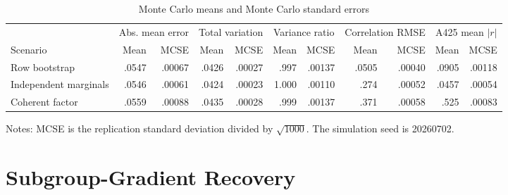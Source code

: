 \documentclass[11pt]{article}
\begin{document}
\begin{table}[!htbp]
\centering
\caption{Monte Carlo means and Monte Carlo standard errors}
\label{tab:s5-simulation}
\begin{threeparttable}
\scriptsize
\begin{tabular}{lrrrrrrrrrr}
\toprule
& \multicolumn{2}{c}{Abs. mean error}
& \multicolumn{2}{c}{Total variation}
& \multicolumn{2}{c}{Variance ratio}
& \multicolumn{2}{c}{Correlation RMSE}
& \multicolumn{2}{c}{A425 mean $|r|$} \\
\cmidrule(lr){2-3}\cmidrule(lr){4-5}\cmidrule(lr){6-7}
\cmidrule(lr){8-9}\cmidrule(lr){10-11}
Scenario & Mean & MCSE & Mean & MCSE & Mean & MCSE & Mean & MCSE & Mean & MCSE \\
\midrule
Row bootstrap
  & .0547 & .00067 & .0426 & .00027 & .997 & .00137
  & .0505 & .00040 & .0905 & .00118 \\
Independent marginals
  & .0546 & .00061 & .0424 & .00023 & 1.000 & .00110
  & .274 & .00052 & .0457 & .00054 \\
Coherent factor
  & .0559 & .00088 & .0435 & .00028 & .999 & .00137
  & .371 & .00058 & .525 & .00083 \\
\bottomrule
\end{tabular}
\begin{tablenotes}[flushleft]
\footnotesize
\item Notes: MCSE is the replication standard deviation divided by $\sqrt{1000}$. The simulation
seed is 20260702.
\end{tablenotes}
\end{threeparttable}
\end{table}

\section{Subgroup-Gradient Recovery}
\end{document}
